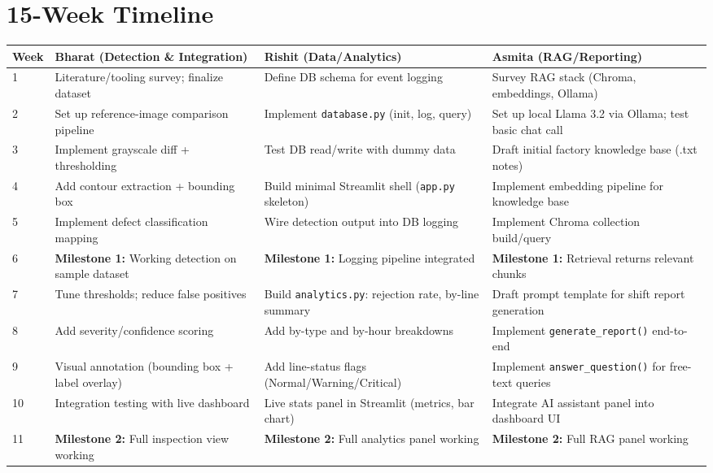 \documentclass[11pt]{article}
\begin{document}
\section{15-Week Timeline}

\begin{longtable}{@{}p{1.6cm}p{4.3cm}p{4.3cm}p{4.3cm}@{}}
\toprule
\textbf{Week} & \textbf{Bharat (Detection \& Integration)} & \textbf{Rishit (Data/Analytics)} & \textbf{Asmita (RAG/Reporting)} \\
\midrule
\endhead
1 & Literature/tooling survey; finalize dataset & Define DB schema for event logging & Survey RAG stack (Chroma, embeddings, Ollama) \\
2 & Set up reference-image comparison pipeline & Implement \texttt{database.py} (init, log, query) & Set up local Llama 3.2 via Ollama; test basic chat call \\
3 & Implement grayscale diff + thresholding & Test DB read/write with dummy data & Draft initial factory knowledge base (.txt notes) \\
4 & Add contour extraction + bounding box & Build minimal Streamlit shell (\texttt{app.py} skeleton) & Implement embedding pipeline for knowledge base \\
5 & Implement defect classification mapping & Wire detection output into DB logging & Implement Chroma collection build/query \\
6 & \textbf{Milestone 1:} Working detection on sample dataset & \textbf{Milestone 1:} Logging pipeline integrated & \textbf{Milestone 1:} Retrieval returns relevant chunks \\
7 & Tune thresholds; reduce false positives & Build \texttt{analytics.py}: rejection rate, by-line summary & Draft prompt template for shift report generation \\
8 & Add severity/confidence scoring & Add by-type and by-hour breakdowns & Implement \texttt{generate\_report()} end-to-end \\
9 & Visual annotation (bounding box + label overlay) & Add line-status flags (Normal/Warning/Critical) & Implement \texttt{answer\_question()} for free-text queries \\
10 & Integration testing with live dashboard & Live stats panel in Streamlit (metrics, bar chart) & Integrate AI assistant panel into dashboard UI \\
11 & \textbf{Milestone 2:} Full inspection view working & \textbf{Milestone 2:} Full analytics panel working & \textbf{Milestone 2:} Full RAG panel working \\

\end{longtable}
\end{document}
